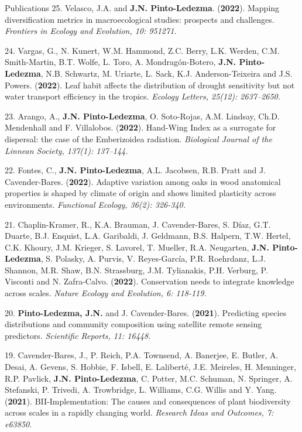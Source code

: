 \documentclass{resume} %
\begin{document}
\begin{rSection}{Publications}
{25.} {Velasco\dag, J.A. and} {\bf{J.N. Pinto-Ledezma\dag}}. {({\bf{2022}}). Mapping diversification metrics in macroecological studies: prospects and challenges.} {\em Frontiers in Ecology and Evolution, 10: 951271.}

{24.}  {Vargas, G., N. Kunert, W.M. Hammond, Z.C. Berry, L.K. Werden, C.M. Smith-Martin, B.T. Wolfe, L. Toro, A. Mondragón-Botero, } {\bf{J.N. Pinto-Ledezma}}, {N.B. Schwartz, M. Uriarte, L. Sack, K.J. Anderson-Teixeira and J.S. Powers. ({\bf{2022}}). Leaf habit affects the distribution of drought sensitivity but not water transport efficiency in the tropics.} {\em Ecology Letters, 25(12): 2637–2650.}

{23.} {Arango, A.,} {\bf{J.N. Pinto-Ledezma}}, {O. Soto-Rojas, A.M. Lindsay, Ch.D. Mendenhall and F. Villalobos. ({\bf{2022}}). Hand-Wing Index as a surrogate for dispersal: the case of the Emberizoidea radiation.} {\em Biological Journal of the Linnean Society, 137(1): 137–144.}

{22.} {Fontes, C.,} {\bf{J.N. Pinto-Ledezma}}, {A.L. Jacobsen, R.B. Pratt and J. Cavender-Bares. ({\bf{2022}}). Adaptive variation among oaks in wood anatomical properties is shaped by climate of origin and shows limited plasticity across environments.} {\em Functional Ecology, 36(2): 326-340.}

{21.} {Chaplin-Kramer, R., K.A. Brauman, J. Cavender-Bares, S. Díaz, G.T. Duarte, B.J. Enquist, L.A. Garibaldi, J. Geldmann, B.S. Halpern, T.W. Hertel, C.K. Khoury, J.M. Krieger, S. Lavorel, T. Mueller, R.A. Neugarten,} {\bf{J.N. Pinto-Ledezma}}, {S. Polasky, A. Purvis, V. Reyes-García, P.R. Roehrdanz, L.J. Shannon, M.R. Shaw, B.N. Strassburg, J.M. Tylianakis, P.H. Verburg, P. Visconti and N. Zafra-Calvo. ({\bf{2022}}). Conservation needs to integrate knowledge across scales.} {\em Nature Ecology and Evolution, 6: 118-119.}

{20.} {\bf{Pinto-Ledezma, J.N.}} {and J. Cavender-Bares. ({{\bf 2021}}). Predicting species distributions and community composition using satellite remote sensing predictors.} {\em Scientific Reports, 11: 16448.}

{19.} {Cavender-Bares, J., P. Reich, P.A. Townsend, A. Banerjee, E. Butler, A. Desai, A. Gevens, S. Hobbie, F. Isbell, E. Laliberté, J.E. Meireles, H. Menninger, R.P. Pavlick, {\bf{J.N. Pinto-Ledezma}}, C. Potter, M.C. Schuman, N. Springer, A. Stefanski, P. Trivedi, A. Trowbridge, L. Williams, C.G. Willis and Y. Yang. ({{\bf 2021}}). BII-Implementation: The causes and consequences of plant biodiversity across scales in a rapidly changing world.} {\em Research Ideas and Outcomes, 7: e63850}. 


\end{rSection}
\end{document}

